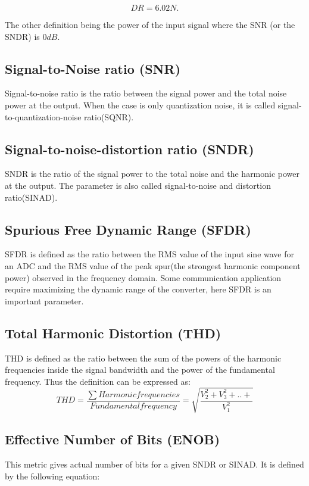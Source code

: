 \begin{equation}
    DR = 6.02N.
\end{equation}

The other definition being the power of the input signal where the SNR (or the SNDR) is $0dB$. 

\subsection{Signal-to-Noise ratio (SNR)}
Signal-to-noise ratio is the ratio between the signal power and the total noise power at the output. When the case is only quantization noise, it is called signal-to-quantization-noise ratio(SQNR). 

\subsection{Signal-to-noise-distortion ratio (SNDR)}
SNDR is the ratio of the signal power to the total noise and the harmonic power at the output. The parameter is also called signal-to-noise and distortion ratio(SINAD).  

\subsection{Spurious Free Dynamic Range (SFDR)}
SFDR is defined as the ratio between the RMS value of the input sine wave for an ADC and the RMS value of the peak spur(the strongest harmonic component power) observed in the frequency domain. Some communication application require maximizing the dynamic range of the converter, here SFDR is an important parameter. 

\subsection{Total Harmonic Distortion (THD)}
THD is defined  as the ratio between the sum of the powers of the harmonic frequencies inside the signal bandwidth and the power of the fundamental frequency. Thus the definition can be expressed as:
\begin{equation}
    THD = \frac{\sum Harmonic frequencies}{Fundamental frequency} = \sqrt{\frac{V_2^2 + V_3^2 + .. +}{V_1^2}}
\end{equation}

\subsection{Effective Number of Bits (ENOB)}
This metric gives actual number of bits for a given SNDR or SINAD. It is defined by the following equation:


